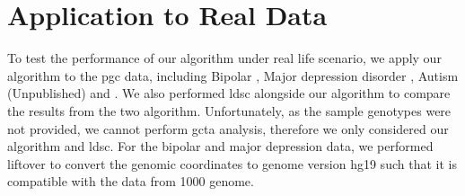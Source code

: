 	
	\section{Application to Real Data}
	To test the performance of our algorithm under real life scenario, we apply our algorithm to the \gls{pgc} data, including Bipolar \citep{PsychiatricGWASConsortiumBipolarDisorderWorkingGroup2011}, Major depression disorder \citep{Ripke2013b}, Autism (Unpublished) and  \citep{Ripke2013}.
	We also performed \gls{ldsc} alongside our algorithm to compare the results from the two algorithm.
	Unfortunately, as the sample genotypes were not provided, we cannot perform \gls{gcta} analysis, therefore we only considered our algorithm and \gls{ldsc}.
	For the bipolar and major depression data, we performed liftover \citep{Hinrichs2006} to convert the genomic coordinates to genome version hg19 such that it is compatible with the data from 1000 genome.
	
